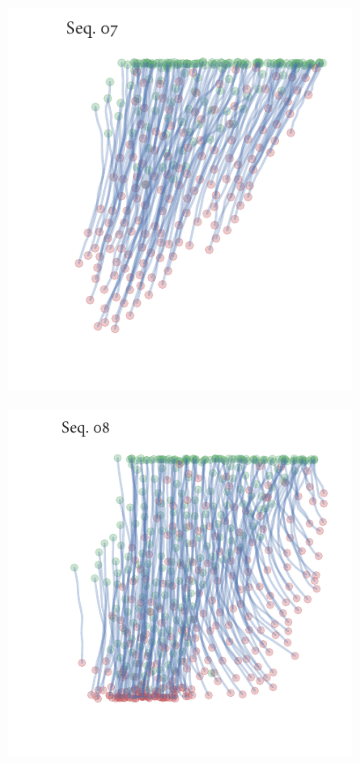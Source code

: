 \begin{figure}[h]
	\begin{subfigure}[t]{0.5\textwidth}
		\centering
		\includegraphics{sequence07.pdf}
	\end{subfigure}%
	\begin{subfigure}[t]{0.5\textwidth}
		\centering
		\includegraphics{sequence08.pdf}
	\end{subfigure}
	\begin{subfigure}[t]{0.5\textwidth}

\end{subfigure}
\end{figure}
